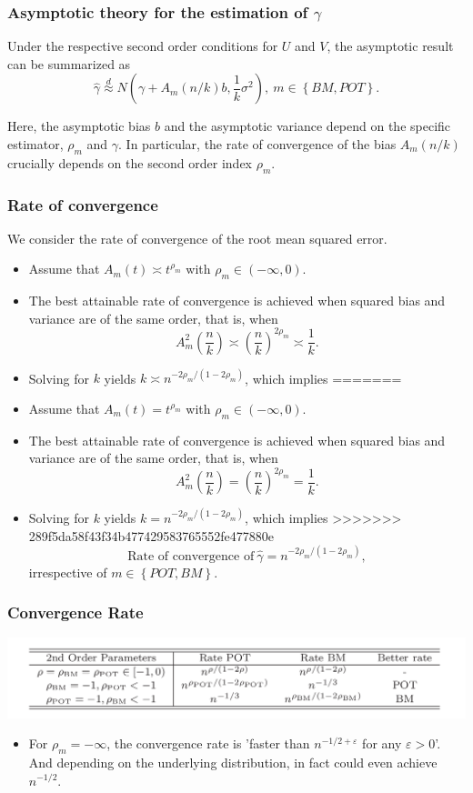 \documentclass{beamer}
\newcommand{\suit}[1]{\left(#1\right)}
\newcommand{\set}[1]{\left\{#1\right\}}
\begin{document}
\begin{frame}
    \frametitle{Asymptotic theory for the estimation of $\gamma$}
    Under the respective second order conditions for $U$ and $V$, the asymptotic result can be summarized as 
    $$
\hat{\gamma}\stackrel{d}{\approx} N\suit{\gamma+A_m(n/k)b,\frac{1}{k}\sigma^2}, \ m \in \set{BM,POT}.
    $$
    
    Here, the asymptotic bias $b$ and the asymptotic variance depend on the specific estimator, $\rho_m$ and $\gamma$. In particular,
    the rate of convergence of the bias $A_m(n/k)$ crucially depends on the second order index $\rho_m$.

\end{frame}

\begin{frame}
    \frametitle{Rate of convergence}
We consider the rate of convergence of the root mean squared error.

\begin{itemize}
<<<<<<< HEAD
    \item Assume that $A_m(t) \asymp t^{\rho_m}$ with $\rho_m\in (-\infty,0)$.
    \item The best attainable
    rate of convergence is achieved when squared bias and variance are of the same order, that is, when 
    $$
        A_m^2\suit{\frac{n}{k}} \asymp \suit{\frac{n}{k}}^{2\rho_m} \asymp \frac{1}{k}.
    $$
    \item Solving for $k$ yields $k \asymp n^{-2\rho_m/(1-2\rho_m)}$, which implies
=======
    \item Assume that $A_m(t)=t^{\rho_m}$ with $\rho_m\in (-\infty,0)$.
    \item The best attainable
    rate of convergence is achieved when squared bias and variance are of the same order, that is, when 
    $$
        A_m^2\suit{\frac{n}{k}} = \suit{\frac{n}{k}}^{2\rho_m}=\frac{1}{k}.
    $$
    \item Solving for $k$ yields $k=n^{-2\rho_m/(1-2\rho_m)}$, which implies
>>>>>>> 289f5da58f43f34b477429583765552fe477880e
    $$
\text{Rate of convergence of} \ \hat{\gamma} = n^{-2\rho_m/(1-2\rho_m)},
    $$
    irrespective of $m \in \set{POT,BM}$.
\end{itemize}
    

\end{frame}

\begin{frame}
    \frametitle{Convergence Rate}
\includegraphics[width=1\textwidth]{fig2.png}
    
\begin{itemize}
    \item For $\rho_m=-\infty$, the convergence rate is 'faster than $n^{-1/2+\varepsilon}$ for any $\varepsilon>0$'. And depending on the underlying distribution, in fact could even achieve $n^{-1/2}$.
\end{itemize}
\end{frame}
\end{document}
